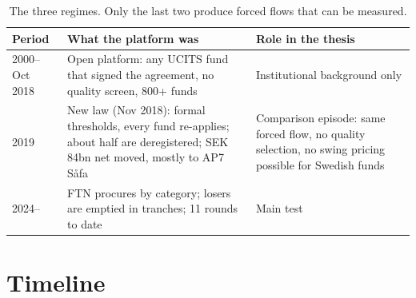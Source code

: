 \documentclass[11pt,a4paper]{article}
\begin{document}
\begin{table}[h]
\centering\small
\begin{tabular}{@{}p{2.6cm}p{5.2cm}p{7.4cm}@{}}
\toprule
Period & What the platform was & Role in the thesis \\
\midrule
2000--Oct 2018 & Open platform: any UCITS fund that signed the agreement, no quality screen, 800+ funds & Institutional background only \\
2019 & New law (Nov 2018): formal thresholds, every fund re-applies; about half are deregistered; SEK 84bn net moved, mostly to AP7 Såfa & Comparison episode: same forced flow, no quality selection, no swing pricing possible for Swedish funds \\
2024-- & FTN procures by category; losers are emptied in tranches; 11 rounds to date & Main test \\
\bottomrule
\end{tabular}
\caption{The three regimes. Only the last two produce forced flows that can be measured.}
\end{table}

\section{Timeline}
\end{document}
